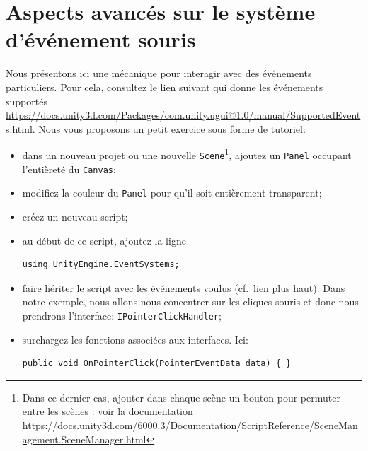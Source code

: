 \documentclass[a4paper,10pt]{article}
\begin{document}
\section{Aspects avancés sur le système d'événement souris}

Nous présentons ici une mécanique pour interagir avec des événements particuliers. Pour cela, consultez le lien suivant qui donne les événements supportés \url{https://docs.unity3d.com/Packages/com.unity.ugui@1.0/manual/SupportedEvents.html}. Nous vous proposons un petit exercice sous forme de tutoriel:
\begin{itemize}
	\item dans un nouveau projet ou une nouvelle \texttt{Scene}\footnote{Dans ce dernier cas, ajouter dans chaque scène un bouton pour permuter entre les scènes : voir la documentation \href{https://docs.unity3d.com/6000.3/Documentation/ScriptReference/SceneManagement.SceneManager.html}{https://docs.unity3d.com/6000.3/Documentation/ScriptReference/SceneManagement.SceneManager.html}}, ajoutez un \texttt{Panel} occupant l'entièreté du \texttt{Canvas};
	\item modifiez la couleur du \texttt{Panel} pour qu'il soit entièrement transparent;
	\item créez un nouveau script;
	\item au début de ce script, ajoutez la ligne
\begin{lstlisting}
using UnityEngine.EventSystems;	
\end{lstlisting}	
	\item faire hériter le script avec les événements voulus (cf.~lien plus haut). Dans notre exemple, nous allons nous concentrer sur les cliques souris et donc nous prendrons l'interface: \texttt{IPointerClickHandler};
	\item surchargez les fonctions associées aux interfaces. Ici: 
\begin{lstlisting}
public void OnPointerClick(PointerEventData data) { }
\end{lstlisting}		
\end{itemize}
\end{document}
